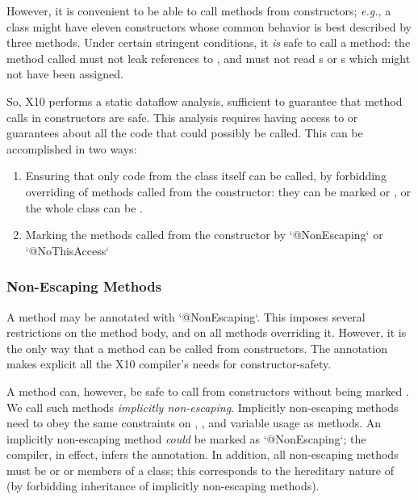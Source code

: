 However, it is convenient to be able to call methods from constructors; {\em
e.g.}, a class might have eleven constructors whose common behavior is best
described by three methods.
Under certain stringent conditions, it {\em is}
safe to call a method: the method called must not leak references to
, and must not read s or s which might not have
been assigned.

So, X10 performs a static dataflow analysis, sufficient to guarantee that
method calls in constructors are safe.  This analysis requires having access
to or guarantees about all the code that could possibly be called.  This can
be accomplished in two ways:
\begin{enumerate}
\item Ensuring that only code from the class itself can be called, by
      forbidding overriding of
      methods called from the constructor: they can be marked  or
      , or the whole class can be .
\item Marking the methods called from the constructor by
      \xcd`@NonEscaping` or \xcd`@NoThisAccess`
\end{enumerate}

\subsubsection{Non-Escaping Methods}


A method may be annotated with \xcd`@NonEscaping`.  This
imposes several restrictions on the method body, and on all methods overriding
it.  However, it is the only way that a method can be called from
constructors.  The
 annotation makes explicit all the X10 compiler's needs for
constructor-safety.

A method can, however, be safe to call from constructors without being marked
. We call such methods {\em implicitly non-escaping}.
Implicitly non-escaping methods need to obey the same constraints on
, , and variable usage as  methods. An
implicitly non-escaping method {\em could} be marked as
\xcd`@NonEscaping`; the compiler, in
effect, infers the annotation. In addition, all non-escaping methods
must be  or  or members of a  class; this
corresponds to the hereditary nature of  (by forbidding
inheritance of implicitly non-escaping methods).

